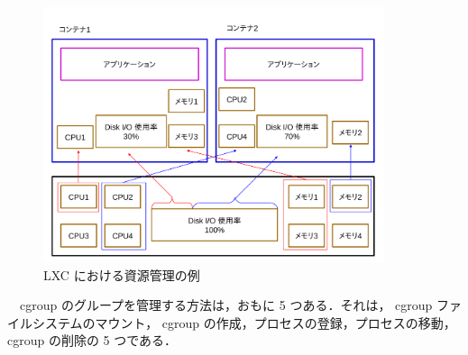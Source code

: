 \documentclass[graduation-thesis]{jsarticle}
\begin{document}
\begin{figure}[H]
	\begin{center}
		\includegraphics[width=10.0cm, clip]{images/container.pdf}
		\caption{LXC における資源管理の例}
		\label{fig:grouping}
	\end{center}
\end{figure}
　cgroup のグループを管理する方法は，おもに 5 つある．それは， cgroup ファイルシステムのマウント， cgroup の作成，プロセスの登録，プロセスの移動， cgroup の削除の 5 つである．
\end{document}

